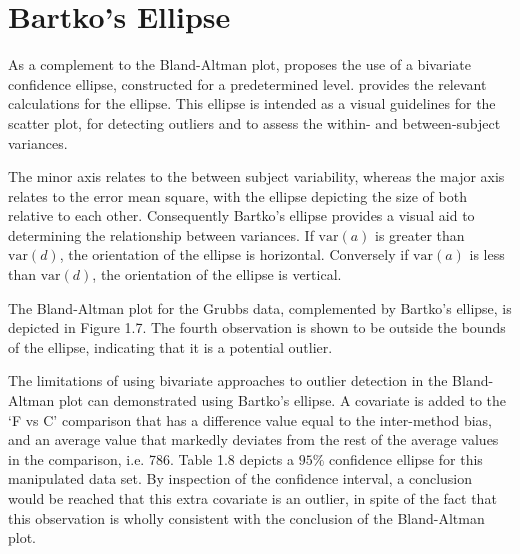 \documentclass[Chap1main.tex]{subfiles}
\begin{document}
\newpage
\section{Bartko's Ellipse}
As a complement to the Bland-Altman plot, \citet{Bartko} proposes
the use of a bivariate confidence ellipse, constructed for a
predetermined level. \citet{AltmanEllipse} provides the relevant calculations for the
ellipse. This ellipse is intended as a visual
guidelines for the scatter plot, for detecting outliers and to
assess the within- and between-subject variances.

The minor axis relates to the between subject variability, whereas
the major axis relates to the error mean square, with the ellipse
depicting the size of both relative to each other.
Consequently Bartko's ellipse provides a visual aid to determining the
relationship between variances. If $\mbox{var}(a)$ is greater than $\mbox{var}(d)$, the orientation of the ellipse is horizontal. Conversely if $\mbox{var}(a)$ is less than $\mbox{var}(d)$, the orientation of the ellipse is vertical.



The Bland-Altman plot for the Grubbs data, complemented by Bartko's ellipse, is depicted in Figure 1.7.
The fourth observation is shown to be outside the bounds of the ellipse, indicating that it is a potential outlier.



The limitations of using bivariate approaches to outlier detection
in the Bland-Altman plot can demonstrated using Bartko's ellipse.
A covariate is added to the `F vs C' comparison that has a
difference value equal to the inter-method bias, and an average
value that markedly deviates from the rest of the average values
in the comparison, i.e. 786. Table 1.8 depicts a $95\%$ confidence
ellipse for this manipulated data set. By inspection of the
confidence interval, a conclusion would be reached that this extra
covariate is an outlier, in spite of the fact that this
observation is wholly consistent with the conclusion of the
Bland-Altman plot.

\end{document}
